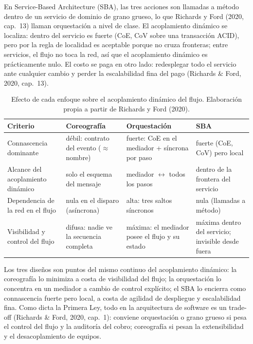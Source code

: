 En Service-Based Architecture (SBA), las tres acciones son llamadas a método
dentro de un servicio de dominio de grano grueso, lo que Richards y Ford (2020,
cap.~13) llaman orquestación a nivel de clase. El acoplamiento dinámico se
localiza: dentro del servicio es fuerte (CoE, CoV sobre una transacción ACID),
pero por la regla de localidad es aceptable porque no cruza fronteras; entre
servicios, el flujo no toca la red, así que el acoplamiento dinámico es
prácticamente nulo. El costo se paga en otro lado: redesplegar todo el servicio
ante cualquier cambio y perder la escalabilidad fina del pago (Richards \& Ford,
2020, cap.~13).

\begin{table}[H]
  \centering
  \caption{Efecto de cada enfoque sobre el acoplamiento dinámico del flujo.
    Elaboración propia a partir de Richards y Ford (2020).}
  \label{tab:p1a-comparacion}
  \small
  \renewcommand{\arraystretch}{1.35}
  \begin{tabularx}{\textwidth}{>{\raggedright\arraybackslash}p{3.1cm} >{\raggedright\arraybackslash}X >{\raggedright\arraybackslash}X >{\raggedright\arraybackslash}X}
    \toprule
    \textbf{Criterio} & \textbf{Coreografía} & \textbf{Orquestación} & \textbf{SBA} \\
    \midrule
    Connascencia dominante &
      débil: contrato del evento ($\approx$ nombre) &
      fuerte: CoE en el mediador + síncrona por paso &
      fuerte (CoE, CoV) pero local \\
    Alcance del acoplamiento dinámico &
      solo el esquema del mensaje &
      mediador $\leftrightarrow$ todos los pasos &
      dentro de la frontera del servicio \\
    Dependencia de la red en el flujo &
      nula en el disparo (asíncrona) &
      alta: tres saltos síncronos &
      nula (llamadas a método) \\
    Visibilidad y control del flujo &
      difusa: nadie ve la secuencia completa &
      máxima: el mediador posee el flujo y su estado &
      máxima dentro del servicio; invisible desde fuera \\
    \bottomrule
  \end{tabularx}
\end{table}

Los tres diseños son puntos del mismo continuo del acoplamiento dinámico: la
coreografía lo minimiza a costa de visibilidad del flujo; la orquestación lo
concentra en un mediador a cambio de control explícito; el SBA lo encierra como
connascencia fuerte pero local, a costa de agilidad de despliegue y escalabilidad
fina. Como dicta la Primera Ley, todo en la arquitectura de software es un
trade-off (Richards \& Ford, 2020, cap.~1): conviene orquestación o grano
grueso si pesa el control del flujo y la auditoría del cobro; coreografía si
pesan la extensibilidad y el desacoplamiento de equipos.
